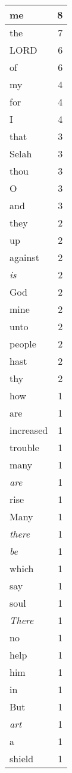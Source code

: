 \begin{center}
\begin{longtable}{l|r}
\hline \hline
\endlastfoot
me & 8 \\ \hline
the & 7 \\ \hline
LORD & 6 \\ \hline
of & 6 \\ \hline
my & 4 \\ \hline
for & 4 \\ \hline
I & 4 \\ \hline
that & 3 \\ \hline
Selah & 3 \\ \hline
thou & 3 \\ \hline
O & 3 \\ \hline
and & 3 \\ \hline
they & 2 \\ \hline
up & 2 \\ \hline
against & 2 \\ \hline
\emph{is} & 2 \\ \hline
God & 2 \\ \hline
mine & 2 \\ \hline
unto & 2 \\ \hline
people & 2 \\ \hline
hast & 2 \\ \hline
thy & 2 \\ \hline
how & 1 \\ \hline
are & 1 \\ \hline
increased & 1 \\ \hline
trouble & 1 \\ \hline
many & 1 \\ \hline
\emph{are} & 1 \\ \hline
rise & 1 \\ \hline
Many & 1 \\ \hline
\emph{there} & 1 \\ \hline
\emph{be} & 1 \\ \hline
which & 1 \\ \hline
say & 1 \\ \hline
soul & 1 \\ \hline
\emph{There} & 1 \\ \hline
no & 1 \\ \hline
help & 1 \\ \hline
him & 1 \\ \hline
in & 1 \\ \hline
But & 1 \\ \hline
\emph{art} & 1 \\ \hline
a & 1 \\ \hline
shield & 1 \\ \hline

\end{longtable}
\end{center}
